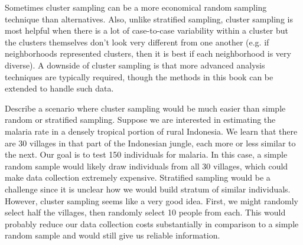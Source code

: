 Sometimes cluster sampling can be a more economical random sampling technique than alternatives. Also, unlike stratified sampling, cluster sampling is most helpful when there is a lot of case-to-case variability within a cluster but the clusters themselves don't look very different from one another (e.g. if neighborhoods represented clusters, then it is best if each neighborhood is very diverse). A downside of cluster sampling is that more advanced analysis techniques are typically required, though the methods in this book can be extended to handle such data.

\begin{example}{Describe a scenario where cluster sampling would be much easier than simple random or stratified sampling.}
Suppose we are interested in estimating the malaria rate in a densely tropical portion of rural Indonesia. We learn that there are 30 villages in that part of the Indonesian jungle, each more or less similar to the next. Our goal is to test 150 individuals for malaria. In this case, a simple random sample would likely draw individuals from all 30 villages, which could make data collection extremely expensive. Stratified sampling would be a challenge since it is unclear how we would build stratum of similar individuals. However, cluster sampling seems like a very good idea. First, we might randomly select half the villages, then randomly select 10 people from each. This would probably reduce our data collection costs substantially in comparison to a simple random sample and would still give us reliable information.


\end{example}

